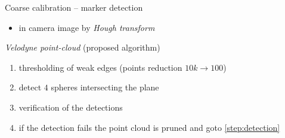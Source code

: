 \documentclass[pdf]{beamer}
\begin{document}
%			
%			

	\begin{frame}{Coarse calibration -- marker detection}
		\begin{itemize}
			\item in camera image by \emph{Hough transform}
		\end{itemize}
		\begin{alertblock}{\emph{Velodyne point-cloud} (proposed algorithm)}
		\begin{enumerate}
			\item thresholding of weak edges (points reduction $10k \rightarrow 100$)
			\item detect $4$ spheres intersecting the plane \label{step:detection}
			\item verification of the detections
			\item if the detection fails the point cloud is pruned and goto \ref{step:detection}
		\end{enumerate}
		\end{alertblock}


\end{frame}
\end{document}

